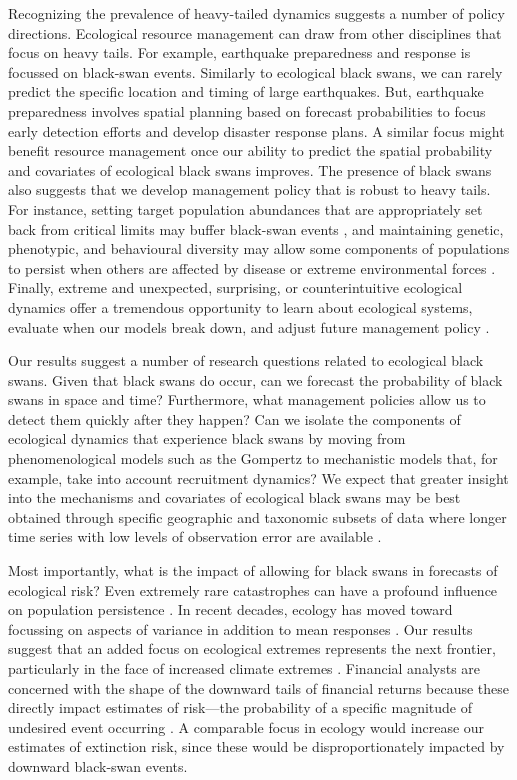 Recognizing the prevalence of heavy-tailed dynamics suggests a number of
policy directions. Ecological resource management can draw from other
disciplines that focus on heavy tails. For example, earthquake preparedness
and response is focussed on black-swan events. Similarly to ecological black
swans, we can rarely predict the specific location and timing of large
earthquakes. But, earthquake preparedness involves spatial planning based on
forecast probabilities to focus early detection efforts and develop disaster
response plans. A similar focus might benefit resource management once our
ability to predict the spatial probability and covariates of ecological black
swans improves. The presence of black swans also suggests that we develop
management policy that is robust to heavy tails. For instance, setting target
population abundances that are appropriately set back from critical limits may
buffer black-swan events \citep[e.g.][]{caddy1996}, and maintaining genetic,
phenotypic, and behavioural diversity may allow some components of populations
to persist when others are affected by disease or extreme environmental forces
\citep[e.g.][]{hilborn2003, schindler2010, anderson2014}. Finally, extreme and
unexpected, surprising, or counterintuitive ecological dynamics offer a
tremendous opportunity to learn about ecological systems, evaluate when our
models break down, and adjust future management policy \citep{doak2008,
  pine-iii2009, lindenmayer2010}.

Our results suggest a number of research questions related to ecological black
swans. Given that black swans do occur, can we forecast the probability of
black swans in space and time? Furthermore, what management policies allow us
to detect them quickly after they happen? Can we isolate the components of
ecological dynamics that experience black swans by moving from
phenomenological models such as the Gompertz to mechanistic models that, for
example, take into account recruitment dynamics? We expect that greater
insight into the mechanisms and covariates of ecological black swans may be
best obtained through specific geographic and taxonomic subsets of data where
longer time series with low levels of observation error are available
\citep[e.g.][]{segura2013}.

Most importantly, what is the impact of allowing for black swans in forecasts
of ecological risk? Even extremely rare catastrophes can have a profound
influence on population persistence \citep{mangel1994}. In recent decades,
ecology has moved toward focussing on aspects of variance in addition to mean
responses \citep[e.g.][]{loreau2010a, thompson2013}. Our results suggest that
an added focus on ecological extremes represents the next frontier,
particularly in the face of increased climate extremes \citep{meehl2004,
  thompson2013, ipcc2012}. Financial analysts are concerned with the shape of
the downward tails of financial returns because these directly impact
estimates of risk---the probability of a specific magnitude of undesired event
occurring \citep{rachev2008}. A comparable focus in ecology would increase our
estimates of extinction risk, since these would be disproportionately impacted
by downward black-swan events.

